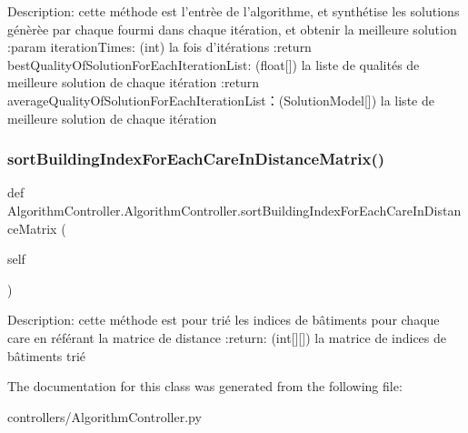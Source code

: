 \begin{DoxyVerb}Description: cette méthode est l'entrèe de l'algorithme, et synthétise les solutions génèrèe par chaque fourmi
        dans chaque itération, et obtenir la meilleure solution
:param iterationTimes: (int) la fois d'itérations
:return bestQualityOfSolutionForEachIterationList: (float[]) la liste de qualités de meilleure solution de chaque itération
:return averageQualityOfSolutionForEachIterationList：(SolutionModel[]) la liste de meilleure solution de chaque itération
\end{DoxyVerb}
 \mbox{\label{class_algorithm_controller_1_1_algorithm_controller_a6be8ad6c0ed5d3733cc3678f4e73a6f5}} 
\subsubsection{\texorpdfstring{sort\+Building\+Index\+For\+Each\+Care\+In\+Distance\+Matrix()}{sortBuildingIndexForEachCareInDistanceMatrix()}}
{\footnotesize\ttfamily def Algorithm\+Controller.\+Algorithm\+Controller.\+sort\+Building\+Index\+For\+Each\+Care\+In\+Distance\+Matrix (\begin{DoxyParamCaption}\item[{}]{self }\end{DoxyParamCaption})}

\begin{DoxyVerb}Description: cette méthode est pour trié les indices de bâtiments pour chaque care en référant la matrice de distance
:return: (int[][]) la matrice de indices de bâtiments trié
\end{DoxyVerb}
 

The documentation for this class was generated from the following file\+:\begin{DoxyCompactItemize}
\item 
controllers/Algorithm\+Controller.\+py\end{DoxyCompactItemize}
